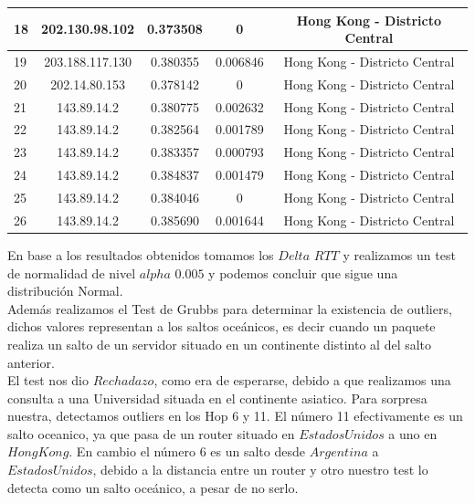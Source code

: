 \begin{tabular}{ | l | c | c | c | c |}
	\hline
		18  &  202.130.98.102  &  0.373508 &  0 & Hong Kong - Districto Central\\
	\hline
		19  &  203.188.117.130 &  0.380355 &  0.006846 & Hong Kong - Districto Central\\
	\hline
		20  &  202.14.80.153  &  0.378142 &  0 & Hong Kong - Districto Central\\
	\hline
		21  &  143.89.14.2  &  0.380775 &  0.002632 & Hong Kong - Districto Central\\
	\hline
		22  &  143.89.14.2  &  0.382564 &  0.001789 & Hong Kong - Districto Central\\
	\hline
		23  &  143.89.14.2  &  0.383357 &  0.000793 & Hong Kong - Districto Central\\
	\hline
		24  &  143.89.14.2  &  0.384837 &  0.001479 & Hong Kong - Districto Central\\
	\hline
		25  &  143.89.14.2  &  0.384046 &  0 & Hong Kong - Districto Central\\
	\hline
		26  &  143.89.14.2  &  0.385690 &  0.001644 & Hong Kong - Districto Central\\
\hline
\end{tabular}

\bigskip

En base a los resultados obtenidos tomamos los $Delta$ $RTT$ y realizamos un test de normalidad de nivel $alpha$ $0.005$ y podemos concluir que sigue una distribución Normal. \\

Además realizamos el Test de Grubbs para determinar la existencia de outliers, dichos valores representan a los saltos oceánicos, es decir cuando un paquete realiza un salto de un servidor situado en un continente distinto al del salto anterior.\\
El test nos dio $Rechadazo$, como era de esperarse, debido a que realizamos una consulta a una Universidad situada en el continente asiatico. Para sorpresa nuestra, detectamos outliers en los Hop 6 y 11. El número 11 efectivamente es un salto oceanico, ya que pasa de un router situado en $Estados Unidos$ a uno en $Hong Kong$. En cambio el número 6 es un salto desde $Argentina$ a $Estados Unidos$, debido a la distancia entre un router y otro nuestro test lo detecta como un salto oceánico, a pesar de no serlo.\\


